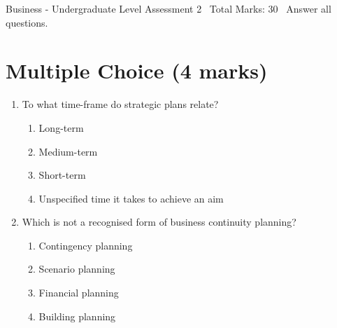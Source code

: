 \documentclass[12pt]{article}
\begin{document}
\begin{center}
Business - Undergraduate Level Assessment 2 \
Total Marks: 30 \
Answer all questions.
\end{center}

\section*{Multiple Choice (4 marks)}
\begin{enumerate}[label=\arabic*.]
\item To what time-frame do strategic plans relate?
\begin{enumerate}[label=(\alph*)]
    \item Long-term
    \item Medium-term
    \item Short-term
    \item Unspecified time it takes to achieve an aim
\end{enumerate}
\item Which is not a recognised form of business continuity planning?
\begin{enumerate}[label=(\alph*)]
    \item Contingency planning
    \item Scenario planning
    \item Financial planning
    \item Building planning
\end{enumerate}
\end{enumerate}
\end{document}
